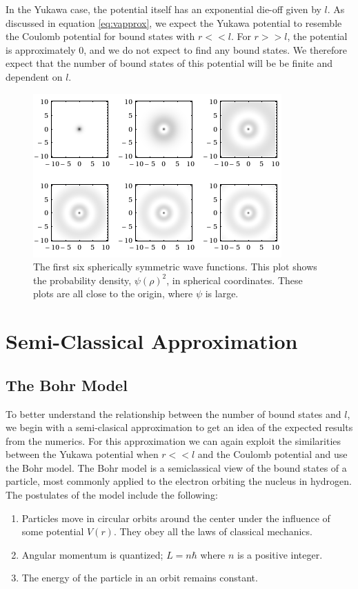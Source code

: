 \documentclass[12pt,twoside]{reedthesis}
\newcommand{\fig}[2]{\begin{figure}\begin{center}#1\end{center}#2\end{figure}}
\begin{document}
In the Yukawa case, the potential itself has an exponential die-off given by $l$. As discussed in equation \eqref{eq:vapprox}, we expect the Yukawa potential to resemble the Coulomb potential for bound states with $r << l$. For $r >> l$, the potential is approximately $0$, and we do not expect to find any bound states. We therefore expect that the number of bound states of this potential will be be finite and dependent on $l$.

\fig{
\includegraphics[scale=0.7]{Figures/densityplots}
}{
\caption{The first six spherically symmetric wave functions. This plot shows the probability density, $\psi(\rho)^2$, in spherical coordinates. These plots are all close to the origin, where $\psi$ is large.}
\label{fig:boundstates}
}
\clearpage %

\chapter{Semi-Classical Approximation}
\section{The Bohr Model}
To better understand the relationship between the number of bound states and $l$, we begin with a semi-clasical approximation to get an idea of the expected results from the numerics. For this approximation we can again exploit the similarities between the Yukawa potential when $r << l$ and the Coulomb potential and use the Bohr model. The Bohr model is a semiclassical view of the bound states of a particle, most commonly applied to the electron orbiting the nucleus in hydrogen. The postulates of the model include the following:
\begin{enumerate}
\item Particles move in circular orbits around the center under the influence of some potential $V(r)$. They obey all the laws of classical mechanics.
\item Angular momentum is quantized; $L = n\hbar$ where $n$ is a positive integer.
\item The energy of the particle in an orbit remains constant.
\end{enumerate}
\end{document}
